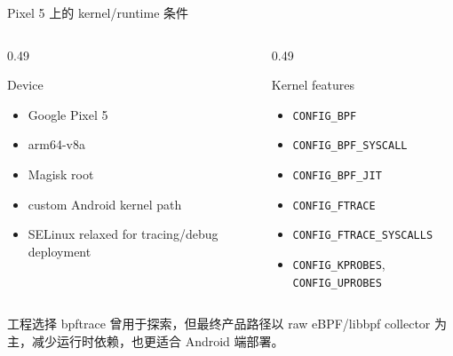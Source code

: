 \documentclass[UTF8,aspectratio=169,10pt]{ctexbeamer}
\newcommand{\code}[1]{\texttt{\small #1}}
\begin{document}
\begin{frame}{Pixel 5 上的 kernel/runtime 条件}
  \begin{columns}[T,totalwidth=\textwidth]
    \begin{column}{0.49\textwidth}
      \begin{block}{Device}
        \begin{itemize}
          \item Google Pixel 5
          \item arm64-v8a
          \item Magisk root
          \item custom Android kernel path
          \item SELinux relaxed for tracing/debug deployment
        \end{itemize}
      \end{block}
    \end{column}
    \begin{column}{0.49\textwidth}
      \begin{block}{Kernel features}
        \begin{itemize}
          \item \code{CONFIG\_BPF}
          \item \code{CONFIG\_BPF\_SYSCALL}
          \item \code{CONFIG\_BPF\_JIT}
          \item \code{CONFIG\_FTRACE}
          \item \code{CONFIG\_FTRACE\_SYSCALLS}
          \item \code{CONFIG\_KPROBES}, \code{CONFIG\_UPROBES}
        \end{itemize}
      \end{block}
    \end{column}
  \end{columns}
  \vspace{0.4em}
  \begin{alertblock}{工程选择}
    bpftrace 曾用于探索，但最终产品路径以 raw eBPF/libbpf collector 为主，减少运行时依赖，也更适合 Android 端部署。
  \end{alertblock}
\end{frame}
\end{document}
